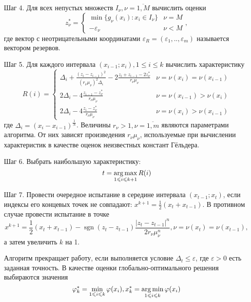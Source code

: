 Шаг 4. Для всех непустых множеств \(I_{\nu },\nu ={\overline {1,M}}\) вычислить оценки
\begin{equation}
  \label{eq:step_4}
  z_{\nu }^{*}={\begin{cases}\min\{g_{\nu }(x_{i}):x_{i}\in I_{\nu }\}&\nu =M\\-\varepsilon _{\nu }&\nu <M\end{cases}},
\end{equation}
где вектор с неотрицательными координатами \(\varepsilon _{R}=(\varepsilon _{1},..,\varepsilon _{m})\) называется вектором резервов.

Шаг 5. Для каждого интервала \((x_{i-1};x_{i}),1\leqslant i\leqslant k\) вычислить характеристику
\begin{equation}
  \label{eq:step3_1}
  R(i)={\begin{cases}\Delta _{i}+{\frac {(z_{i}-z_{i-1})^{2}}{(r_{\nu }\mu _{\nu })^{2}\Delta _{i}}}-2{\frac {z_{i}+z_{i-1}-2z_{\nu }^{*}}{r_{\nu }\mu _{\nu }}}&\nu =\nu (x_{i})=\nu (x_{i-1})\\2\Delta _{i}-4{\frac {z_{i-1}-z_{\nu }^{*}}{r_{\nu }\mu _{\nu }}}&\nu =\nu (x_{i-1})>\nu (x_{i})\\2\Delta _{i}-4{\frac {z_{i}-z_{\nu }^{*}}{r_{\nu }\mu _{\nu }}}&\nu =\nu (x_{i})>\nu (x_{i-1})\end{cases}}
\end{equation}
где \(\Delta _{i}=(x_{i}-x_{i-1})^{\frac{1}{N}}\). Величины \(r_{\nu }>1,\nu ={\overline {1,m}}\)
являются параметрами алгоритма. От них зависят произведения \(r_{\nu }\mu _{\nu }\),
используемые при вычислении характеристик в качестве оценок неизвестных констант Гёльдера.

Шаг 6. Выбрать наибольшую характеристику:
\begin{equation}
\label{step4}
t=\operatorname*{arg\,max}_{1\leqslant i \leqslant k+1}R(i)
\end{equation}

Шаг 7. Провести очередное испытание в середине интервала \((x_{t-1};x_{t})\),
если индексы его концевых точек не совпадают: \(x^{k+1}={\frac {1}{2}}(x_{t}+x_{t-1})\).
В противном случае провести испытание в точке
\begin{displaymath}
  x^{k+1}={\frac {1}{2}}(x_{t}+x_{t-1})-\operatorname {sgn}(z_{t}-z_{t-1}){\frac {|z_{t}-z_{t-1}|^{n}}{2r_{\nu }\mu _{\nu }^{n}}},\nu =\nu (x_{t})=\nu (x_{t-1}),
\end{displaymath}
а затем увеличить \(k\) на 1.

Алгоритм прекращает работу, если выполняется условие \(\Delta_{t}\leqslant \varepsilon\),
где \(\varepsilon>0\) есть заданная точность. В качестве оценки глобально-оптимального решения выбираются значения
\begin{equation}
\varphi_k^*=\min_{1\leqslant i \leqslant k}\varphi(x_i), x_k^*=\operatorname*{arg\,min}_{1\leqslant i \leqslant k}\varphi(x_i)
\end{equation}

